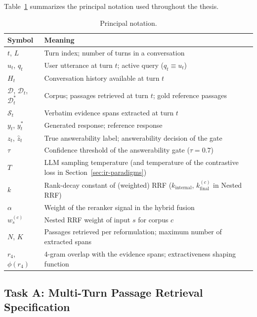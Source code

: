 Table~\ref{tab:notation} summarizes the principal notation used throughout the thesis.

\begin{table}[h]
\centering
\small
\begin{tabular}{ll}
\toprule
\textbf{Symbol} & \textbf{Meaning} \\
\midrule
$t$, $L$ & Turn index; number of turns in a conversation \\
$u_t$, $q_t$ & User utterance at turn $t$; active query ($q_t \equiv u_t$) \\
$H_t$ & Conversation history available at turn $t$ \\
$\mathcal{D}$, $\mathcal{D}_t$, $\mathcal{D}_t^*$ & Corpus; passages retrieved at turn $t$; gold reference passages \\
$\mathcal{S}_t$ & Verbatim evidence spans extracted at turn $t$ \\
$y_t$, $y_t^*$ & Generated response; reference response \\
$z_t$, $\hat{z}_t$ & True answerability label; answerability decision of the gate \\
$\tau$ & Confidence threshold of the answerability gate ($\tau{=}0.7$) \\
$T$ & LLM sampling temperature (and temperature of the contrastive loss in Section~\ref{sec:ir-paradigms}) \\
$k$ & Rank-decay constant of (weighted) RRF ($k_{\text{internal}}$, $k_{\text{final}}^{(c)}$ in Nested RRF) \\
$\alpha$ & Weight of the reranker signal in the hybrid fusion \\
$w_s^{(c)}$ & Nested RRF weight of input $s$ for corpus $c$ \\
$N$, $K$ & Passages retrieved per reformulation; maximum number of extracted spans \\
$r_4$, $\phi(r_4)$ & 4-gram overlap with the evidence spans; extractiveness shaping function \\
\bottomrule
\end{tabular}
\caption{Principal notation.}
\label{tab:notation}
\end{table}

\subsection{Task A: Multi-Turn Passage Retrieval Specification}

